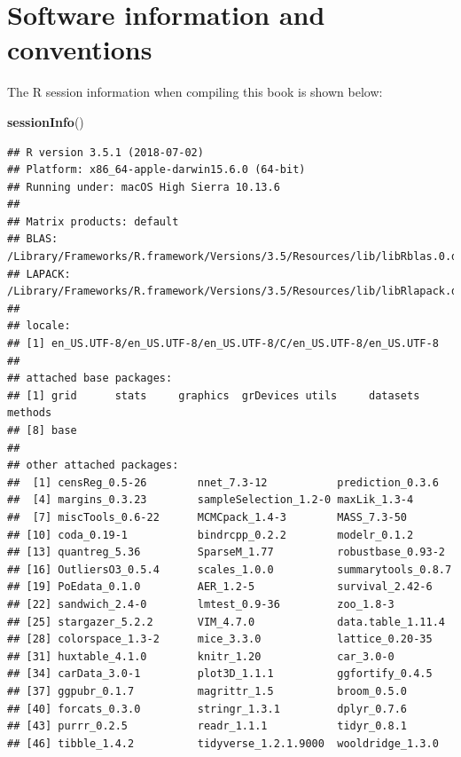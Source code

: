 \documentclass[]{book}
\newenvironment{Shaded}{\begin{snugshade}}{\end{snugshade}}
\newcommand{\KeywordTok}[1]{\textcolor[rgb]{0.13,0.29,0.53}{\textbf{#1}}}
\newcommand{\NormalTok}[1]{#1}
\begin{document}
\hypertarget{software-information-and-conventions}{%
\section*{Software information and
conventions}\label{software-information-and-conventions}}

The R session information when compiling this book is shown below:

\begin{Shaded}
\begin{Highlighting}[]
\KeywordTok{sessionInfo}\NormalTok{()}
\end{Highlighting}
\end{Shaded}

\begin{verbatim}
## R version 3.5.1 (2018-07-02)
## Platform: x86_64-apple-darwin15.6.0 (64-bit)
## Running under: macOS High Sierra 10.13.6
## 
## Matrix products: default
## BLAS: /Library/Frameworks/R.framework/Versions/3.5/Resources/lib/libRblas.0.dylib
## LAPACK: /Library/Frameworks/R.framework/Versions/3.5/Resources/lib/libRlapack.dylib
## 
## locale:
## [1] en_US.UTF-8/en_US.UTF-8/en_US.UTF-8/C/en_US.UTF-8/en_US.UTF-8
## 
## attached base packages:
## [1] grid      stats     graphics  grDevices utils     datasets  methods  
## [8] base     
## 
## other attached packages:
##  [1] censReg_0.5-26        nnet_7.3-12           prediction_0.3.6     
##  [4] margins_0.3.23        sampleSelection_1.2-0 maxLik_1.3-4         
##  [7] miscTools_0.6-22      MCMCpack_1.4-3        MASS_7.3-50          
## [10] coda_0.19-1           bindrcpp_0.2.2        modelr_0.1.2         
## [13] quantreg_5.36         SparseM_1.77          robustbase_0.93-2    
## [16] OutliersO3_0.5.4      scales_1.0.0          summarytools_0.8.7   
## [19] PoEdata_0.1.0         AER_1.2-5             survival_2.42-6      
## [22] sandwich_2.4-0        lmtest_0.9-36         zoo_1.8-3            
## [25] stargazer_5.2.2       VIM_4.7.0             data.table_1.11.4    
## [28] colorspace_1.3-2      mice_3.3.0            lattice_0.20-35      
## [31] huxtable_4.1.0        knitr_1.20            car_3.0-0            
## [34] carData_3.0-1         plot3D_1.1.1          ggfortify_0.4.5      
## [37] ggpubr_0.1.7          magrittr_1.5          broom_0.5.0          
## [40] forcats_0.3.0         stringr_1.3.1         dplyr_0.7.6          
## [43] purrr_0.2.5           readr_1.1.1           tidyr_0.8.1          
## [46] tibble_1.4.2          tidyverse_1.2.1.9000  wooldridge_1.3.0     

\end{verbatim}
\end{document}
